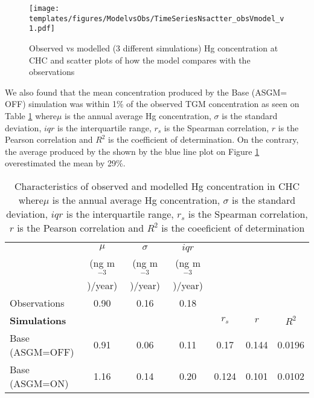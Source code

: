 \begin{figure}[H]
  \texttt{[image: templates/figures/ModelvsObs/TimeSeriesNsactter\_obsVmodel\_v1.pdf]}
  \centering
  \caption{Observed vs modelled (3 different simulations) Hg concentration at CHC and scatter plots of how the model compares with the observations  }
  \label{fig:ModelvsObsNstats}
\end{figure}
\FloatBarrier
\begin{flushleft}
We also found that the mean \hg concentration produced by the Base (ASGM= OFF) simulation was within 1\% of the observed TGM concentration as seen on Table \ref{tab:ModelvsObsStats} where$\mu$ is the annual average Hg concentration, $\sigma$ is the standard deviation, $iqr$ is the interquartile range, $r_s$ is the Spearman correlation, $r$ is the Pearson correlation and $R^2$ is the coefficient of determination. On the contrary, the average \hg produced by the \on shown by the blue line plot on Figure \ref{fig:ModelvsObsNstats} overestimated the mean by 29\%.
 
\end{flushleft}
\setlength{\tabcolsep}{2.5pt}
\begin{table}[H]
  \begin{center}
    \caption{Characteristics of observed and modelled Hg concentration in CHC where$\mu$ is the annual average Hg concentration, $\sigma$ is the standard deviation, $iqr$ is the interquartile range, $r_s$ is the Spearman correlation, $r$ is the Pearson correlation and $R^2$ is the coeeficient of determination}
    \label{tab:ModelvsObsStats}
    \begin{tabular}{lcccccc}
      
                          & $\mu$                 & $\sigma$            & $iqr$               & & & \\
                          &  (ng m$^{-3}$)/year)  & (ng m$^{-3}$)/year) & (ng m$^{-3}$)/year) & & & \\
     \cmidrule{2-4}
     Observations         & 0.90             & 0.16            & 0.18        &  & & \\
     \textbf{Simulations} &                  &                  &               &\textbf{$r_s$} &\textbf{$r$} &\textbf{$R^2$}\\ %
      \hline
      Base (ASGM=OFF)     & 0.91             & 0.06            & 0.11         & 0.17         & 0.144      & 0.0196\\ 
      Base (ASGM=ON)      & 1.16            & 0.14            & 0.20        & 0.124         & 0.101       & 0.0102\\ %
    \end{tabular}
  \end{center}
\end{table}
\FloatBarrier

